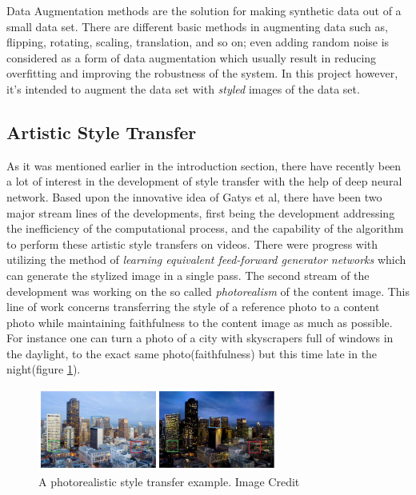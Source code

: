 \documentclass[12pt, a4paper]{scrartcl}
\begin{document}
Data Augmentation methods are the solution for making synthetic data out of a small data set. There are different basic methods in augmenting data such as, flipping, rotating, scaling, translation, and so on; even adding random noise is considered as a form of data augmentation which usually result in reducing overfitting and improving the robustness of the system\cite{DBLP:journals/corr/abs-1712-03689}. In this project however, it's intended to augment the data set with \emph{styled} images of the data set.

\subsection{Artistic Style Transfer}

As it was mentioned earlier in the introduction section, there have recently been a lot of interest in the development of style transfer with the help of deep neural network. Based upon the innovative idea of Gatys et al, there have been two major stream lines of the developments, first being the development addressing the inefficiency of the computational process\citep{DBLP:journals/corr/UlyanovVL16}, and the capability of the algorithm to perform these artistic style transfers on videos. There were progress with utilizing the method of \emph{learning equivalent feed-forward generator networks} which can generate the stylized image in a single pass\citep{DBLP:journals/corr/JohnsonAL16, DBLP:journals/corr/UlyanovLVL16}. The second stream of the development was working on the so called \emph{photorealism} of the content image. This line of work concerns transferring the style of a reference photo to a content photo while maintaining faithfulness to the content image as much as possible\citep{Li}. For instance one can turn a photo of a city with skyscrapers full of windows in the daylight, to the exact same photo(faithfulness) but this time late in the night(figure \ref{fig:skyscrapers}). 

\begin{figure}[h]
	\centering
	\includegraphics[width=0.7\textwidth]{skyscrapers}
	\caption{A photorealistic style transfer example. Image Credit \cite{Luan2017}}
	\label{fig:skyscrapers}
\end{figure}
\end{document}
